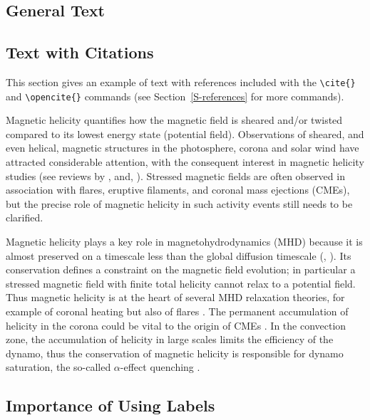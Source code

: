 \documentclass[namedreferences]{solarphysics}
\begin{document}
\begin{article}
{ 
\section{General Text} %
      \label{S-general}      

\subsection{Text with Citations} %
  \label{S-text}
This section gives an example of text with references 
included with the \verb+\cite{}+ and \verb+\opencite{}+ commands
(see Section~\ref{S-references} for more  commands).

Magnetic helicity quantifies how the magnetic field is sheared
and/or twisted compared to its lowest energy state (potential
field). Observations of sheared, and even helical, magnetic
structures in the photosphere, corona and solar wind have
attracted considerable attention, with the consequent interest in
magnetic helicity studies (see reviews by , and,
). Stressed magnetic fields are often observed
in association with flares, eruptive filaments, and coronal mass
ejections (CMEs), but the precise role of magnetic helicity in
such activity events still needs to be clarified.

Magnetic helicity plays a key role in magnetohydrodynamics (MHD)
because it is almost preserved on a timescale less than the global
diffusion timescale (, \citeyear{Berger03}).  
Its conservation defines a
constraint on the magnetic field evolution; in particular a
stressed magnetic field with finite total helicity cannot relax to
a potential field.  Thus magnetic helicity is at the heart of
several MHD relaxation theories, for example of coronal heating
\cite{Heyvaerts84} but also of flares \cite{Kusano04,Melrose04}.
The permanent accumulation of helicity in the corona could be
vital to the origin of CMEs \cite{Rust94,Low97}.  In the
convection zone, the accumulation of helicity in large scales
limits the efficiency of the dynamo, thus the conservation of
magnetic helicity is responsible for dynamo saturation, the
so-called $\alpha$-effect quenching \cite{Brandenburg01}.

\subsection{Importance of Using Labels} %
  \label{S-labels}

}
\end{article}
\end{document}
